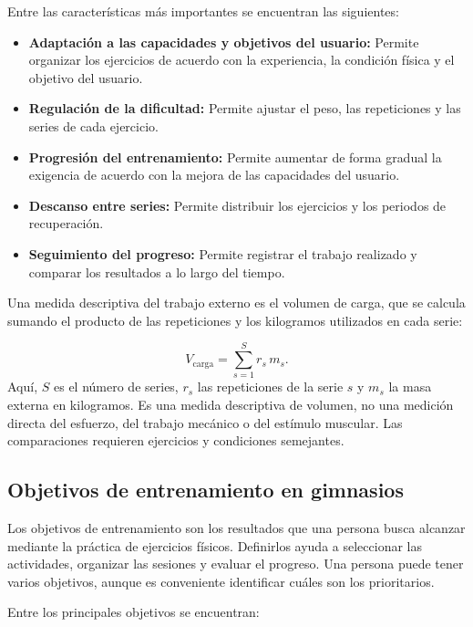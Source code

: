 Entre las características más importantes se encuentran las siguientes:

\begin{itemize}
    \item \textbf{Adaptación a las capacidades y objetivos del usuario:}
    Permite organizar los ejercicios de acuerdo con la experiencia, la
    condición física y el objetivo del usuario.
    \item \textbf{Regulación de la dificultad:}
    Permite ajustar el peso, las repeticiones y las series de cada ejercicio.
    \item \textbf{Progresión del entrenamiento:}
    Permite aumentar de forma gradual la exigencia de acuerdo con la mejora de
    las capacidades del usuario.
    \item \textbf{Descanso entre series:}
    Permite distribuir los ejercicios y los periodos de recuperación.
    \item \textbf{Seguimiento del progreso:}
    Permite registrar el trabajo realizado y comparar los resultados a lo largo
    del tiempo.
\end{itemize}

Una medida descriptiva del trabajo externo es el volumen de carga, que se
calcula sumando el producto de las repeticiones y los kilogramos utilizados
en cada serie:

\begin{equation}
    V_{\mathrm{carga}} = \sum_{s=1}^{S} r_s\,m_s.
    \label{eq:carga-acumulada}
\end{equation}
Aquí, $S$ es el número de series, $r_s$ las repeticiones de la serie $s$ y
$m_s$ la masa externa en kilogramos. Es una medida descriptiva de volumen,
no una medición directa del esfuerzo, del trabajo mecánico o del estímulo
muscular. Las comparaciones requieren ejercicios y condiciones semejantes.

\subsection{Objetivos de entrenamiento en gimnasios}

Los objetivos de entrenamiento son los resultados que una persona busca
alcanzar mediante la práctica de ejercicios físicos. Definirlos ayuda a
seleccionar las actividades, organizar las sesiones y evaluar el progreso. Una
persona puede tener varios objetivos, aunque es conveniente identificar cuáles
son los prioritarios.

Entre los principales objetivos se encuentran:

